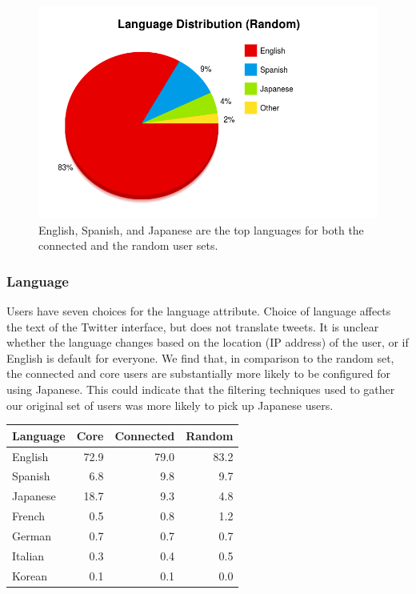 \begin{figure}[h]
 \centering
 \includegraphics[bb=0 0 800 500,scale=.2]{./images/lang-rand.png}
 \caption{English, Spanish, and Japanese are the top languages for both the connected and the random user sets.}
\end{figure}

\subsubsection{Language}

Users have seven choices for the language attribute.  Choice of language affects the text of the Twitter interface, but does not translate tweets.  It is unclear whether the language changes based on the location (IP address) of the user, or if English is default for everyone.  We find that, in comparison to the random set, the connected and core users are substantially more likely to be configured for using Japanese.  This could indicate that the filtering techniques used to gather our original set of users was more likely to pick up Japanese users.

\begin{center}
\begin{tabular}{| l |  r | r | r |}
\hline
\textbf{Language} & \textbf{Core} & \textbf{Connected} & \textbf{Random} \\ \hline
English & 72.9 & 79.0 & 83.2 \\ \hline
Spanish & 6.8 & 9.8 & 9.7 \\ \hline
Japanese & 18.7 & 9.3 & 4.8 \\ \hline
French & 0.5 & 0.8 & 1.2 \\ \hline
German & 0.7 & 0.7 & 0.7 \\ \hline
Italian & 0.3 & 0.4 & 0.5 \\ \hline
Korean & 0.1 &  0.1 & 0.0 \\ \hline
\end{tabular}
\end{center}

